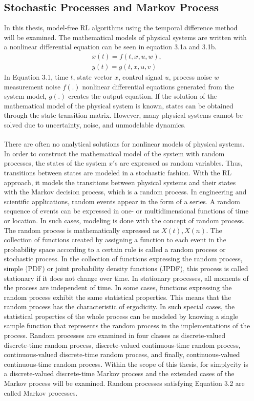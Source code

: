 \documentclass[12pt,twoside,a4]{mwbk}
\begin{document}
\subsection{Stochastic Processes and Markov Process}
In this thesis, model-free RL algorithms using the temporal difference method will be examined. The mathematical models of physical systems are written with a nonlinear differential equation can be seen in equation 3.1a and 3.1b.
\begin{subequations}
\begin{align}
        \dot{x}(t) = f(t,x,u,w), \\ 
        y(t) = g(t,x,u,v)
\end{align}
\end{subequations}
In Equation 3.1, time $t$, state vector $x$, control signal $u$, process noise $w$ measurement noise $f(.)$ nonlinear differential equations generated from the system model, $g(. ) $ creates the output equation. If the solution of the mathematical model of the physical system is known, states can be obtained through the state transition matrix. However, many physical systems cannot be solved due to uncertainty, noise, and unmodelable dynamics.
\\ \\
There are often no analytical solutions for nonlinear models of physical systems. In order to construct the mathematical model of the system with random processes, the states of the system $x'$s are expressed as random variables. Thus, transitions between states are modeled in a stochastic fashion. With the RL approach, it models the transitions between physical systems and their states with the Markov decision process, which is a random process. In engineering and scientific applications, random events appear in the form of a series. A random sequence of events can be expressed in one- or multidimensional functions of time or location. In such cases, modeling is done with the concept of random process. The random process is mathematically expressed as $X(t), X(n)$. The collection of functions created by assigning a function to each event in the probability space according to a certain rule is called a random process or stochastic process. In the collection of functions expressing the random process, simple (PDF) or joint probability density functions (JPDF), this process is called stationary if it does not change over time. In stationary processes, all moments of the process are independent of time. In some cases, functions expressing the random process exhibit the same statistical properties. This means that the random process has the characteristic of ergodicity. In such special cases, the statistical properties of the whole process can be modeled by knowing a single sample function that represents the random process in the implementations of the process. Random processes are examined in four classes as discrete-valued discrete-time random process, discrete-valued continuous-time random process, continuous-valued discrete-time random process, and finally, continuous-valued continuous-time random process. Within the scope of this thesis, for simplycity is a discrete-valued discrete-time Markov process and the extended cases of the Markov process will be examined. Random processes satisfying Equation 3.2 are called Markov processes.
\end{document}
